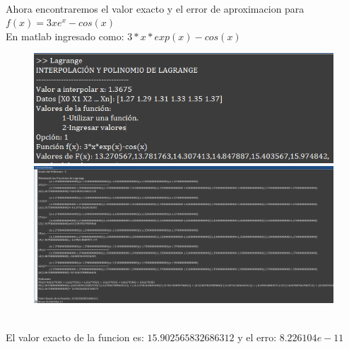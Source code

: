 \documentclass{article}
\theoremstyle{mytheoremstyle}
\theoremstyle{mytheoremstyle}
\theoremstyle{myproblemstyle}
\begin{document}
\pagebreak
\noindent \\ Ahora encontraremos el valor exacto y el error de aproximacion para $f(x)=3xe^x-cos(x)$
\\En matlab ingresado como: $3*x*exp(x)-cos(x)$
\begin{figure}[ht]
    \includegraphics[scale=0.6]{img/eje3_4.png}\\
    \includegraphics[scale=.6]{img/eje3_5.png}
\end{figure}
\noindent \\ El valor exacto de la funcion es: $15.902565832686312$ y el erro: $8.226104e-11$
\end{document}
